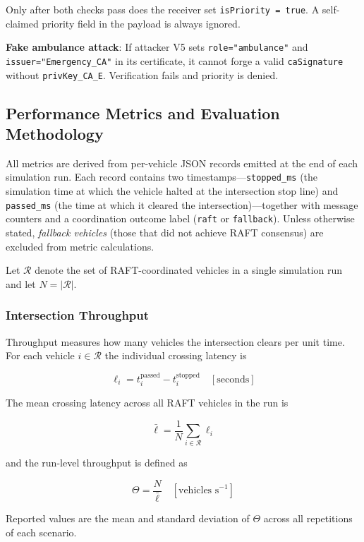 \documentclass[fleqn,10pt]{olplainarticle}
\begin{document}
\noindent Only after both checks pass does the receiver set \texttt{isPriority = true}. A self-claimed priority field in the payload is always ignored.

\textbf{Fake ambulance attack}: If attacker V5 sets \texttt{role="ambulance"} and \texttt{issuer="Emergency\_CA"} in its certificate, it cannot forge a valid \texttt{caSignature} without \texttt{privKey\_CA\_E}. Verification fails and priority is denied.




\subsection{Performance Metrics and Evaluation Methodology}

All metrics are derived from per-vehicle JSON records emitted at the end of each
simulation run. Each record contains two timestamps---\texttt{stopped\_ms} (the
simulation time at which the vehicle halted at the intersection stop line) and
\texttt{passed\_ms} (the time at which it cleared the intersection)---together with
message counters and a coordination outcome label (\texttt{raft} or
\texttt{fallback}). Unless otherwise stated, \emph{fallback vehicles} (those that
did not achieve RAFT consensus) are excluded from metric calculations.

Let $\mathcal{R}$ denote the set of RAFT-coordinated vehicles in a single simulation
run and let $N = |\mathcal{R}|$.

\subsubsection{Intersection Throughput}

Throughput measures how many vehicles the intersection clears per unit time.
For each vehicle $i \in \mathcal{R}$ the individual crossing latency is

\[
  \ell_i = t_i^{\mathrm{passed}} - t_i^{\mathrm{stopped}} \quad [\text{seconds}]
\]

The mean crossing latency across all RAFT vehicles in the run is

\[
  \bar{\ell} = \frac{1}{N} \sum_{i \in \mathcal{R}} \ell_i
\]

and the run-level throughput is defined as

\[
  \Theta = \frac{N}{\bar{\ell}} \quad [\text{vehicles s}^{-1}]
\]

Reported values are the mean and standard deviation of $\Theta$ across all
repetitions of each scenario.
\end{document}
